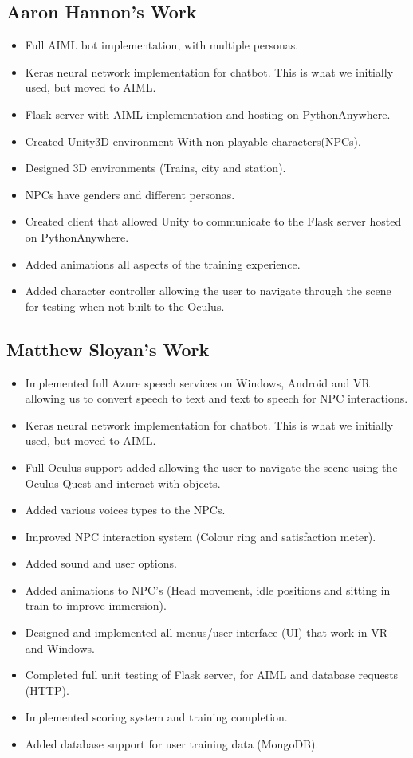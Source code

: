 \subsection{Aaron Hannon's Work}
\begin{itemize}
    \item Full AIML bot implementation, with multiple personas.
    \item Keras neural network implementation for chatbot. This is what we initially used, but moved to AIML.
    \item Flask server with AIML implementation and hosting on PythonAnywhere.
    \item Created Unity3D environment With non-playable characters(NPCs).
    \item Designed 3D environments (Trains, city and station).
    \item NPCs have genders and different personas.
    \item Created client that allowed Unity to communicate to the Flask server hosted on PythonAnywhere.
    \item Added animations all aspects of the training experience.
    \item Added character controller allowing the user to navigate through the scene for testing when not built to the Oculus.
\end{itemize}

\subsection{Matthew Sloyan's Work}
\begin{itemize}
    \item Implemented full Azure speech services on Windows, Android and VR allowing us to convert speech to text and text to speech for NPC interactions.
    \item Keras neural network implementation for chatbot. This is what we initially used, but moved to AIML.
    \item Full Oculus support added allowing the user to navigate the scene using the Oculus Quest and interact with objects.
    \item Added various voices types to the NPCs.
    \item Improved NPC interaction system (Colour ring and satisfaction meter).
    \item Added sound and user options.
    \item Added animations to NPC's (Head movement, idle positions and sitting in train to improve immersion).
    \item Designed and implemented all menus/user interface (UI) that work in VR and Windows.
    \item Completed full unit testing of Flask server, for AIML and database requests (HTTP).
    \item Implemented scoring system and training completion.
    \item Added database support for user training data (MongoDB).
\end{itemize}

